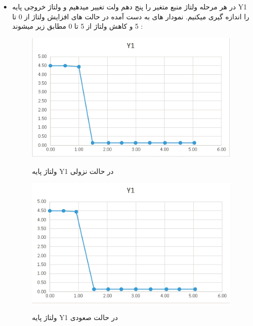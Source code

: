 \documentclass[twoside]{article}
\begin{document}
\begin{itemize}
	\item
	در هر مرحله ولتاژ منبع متغیر را پنج دهم ولت تغییر میدهیم و ولتاژ خروجی پایه Y1 را اندازه گیری میکنیم. نمودار های به دست آمده در حالت های افزایش ولتاژ از 0 تا 5 و کاهش ولتاژ از 5 تا 0 مطابق زیر میشوند :
	\begin{figure}[h!]
		\begin{center}
			\includegraphics[scale=0.75]{nemoodar1}‎
			\caption{ولتاژ پایه Y1 در حالت نزولی}
		\end{center}
	\end{figure} 

	\begin{figure}[h!]
		\begin{center}
			\includegraphics[scale=0.75]{nemoodar2}‎
			\caption{ولتاژ پایه Y1 در حالت صعودی}
		\end{center}
	\end{figure} 


\end{itemize}
\end{document}
